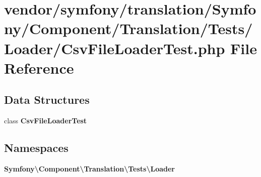 \section{vendor/symfony/translation/\+Symfony/\+Component/\+Translation/\+Tests/\+Loader/\+Csv\+File\+Loader\+Test.php File Reference}
\label{_csv_file_loader_test_8php}
\subsection*{Data Structures}
\begin{DoxyCompactItemize}
\item 
class {\bf Csv\+File\+Loader\+Test}
\end{DoxyCompactItemize}
\subsection*{Namespaces}
\begin{DoxyCompactItemize}
\item 
 {\bf Symfony\textbackslash{}\+Component\textbackslash{}\+Translation\textbackslash{}\+Tests\textbackslash{}\+Loader}
\end{DoxyCompactItemize}
